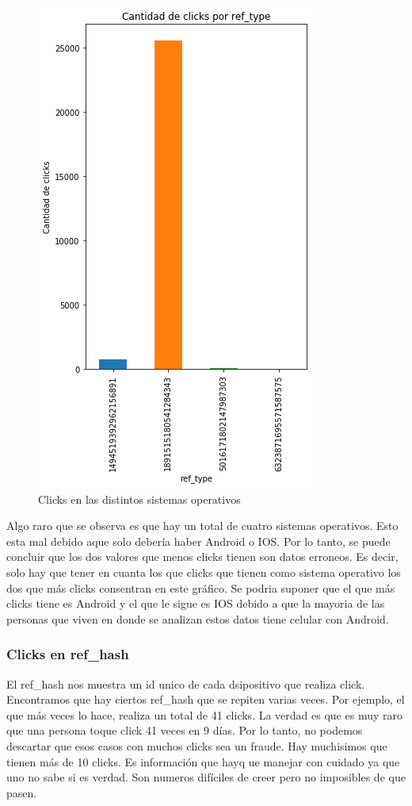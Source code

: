 \documentclass[a4paper, 12pt]{article}
\newcommand\tab[1][1cm]{\hspace*{#1}}
\begin{document}
		\FloatBarrier
		\begin{figure}[h]
			\centering
			\includegraphics[scale = 0.6]{images/clicks/clicks_ref_type.png}
			\caption{Clicks en las distintos sistemas operativos}
		\end{figure}
		\FloatBarrier

		\tab Algo raro que se observa es que hay un total de cuatro sistemas operativos. Esto esta mal debido aque solo debería haber Android o IOS. Por lo tanto, se puede concluir que los dos valores que menos clicks tienen son datos erroneos. Es decir, solo hay que tener en cuanta los que clicks que tienen como sistema operativo los dos que más clicks consentran en este gráfico. Se podria suponer que el que más clicks tiene es Android y el que le sigue es IOS debido a que la mayoria de las personas que viven en donde se analizan estos datos tiene celular con Android.

	\subsubsection{Clicks en ref\_hash}
		\tab El ref\_hash nos muestra un id unico de cada dsipositivo que realiza click. Encontramos que hay ciertos ref\_hash que se repiten varias veces. Por ejemplo, el que más veces lo hace, realiza un total de 41 clicks. La verdad es que es muy raro que una persona toque click 41 veces en 9 días. Por lo tanto, no podemos descartar que esos casos con muchos clicks sea un fraude. Hay muchisimos que tienen más de 10 clicks. Es información que hayq ue manejar con cuidado ya que uno no sabe si es verdad. Son numeros difíciles de creer pero no imposibles de que pasen.
\end{document}
